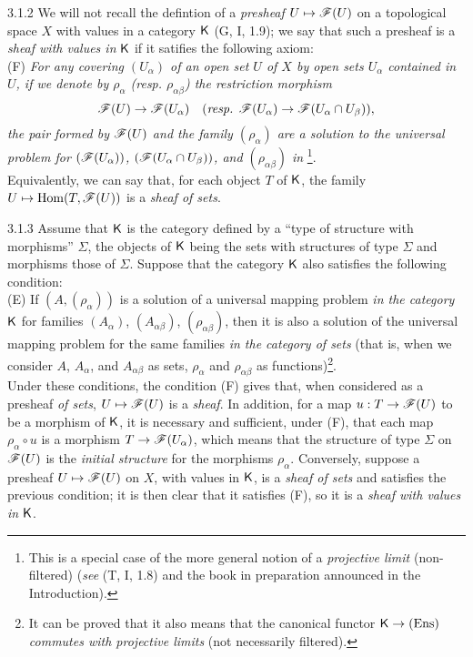 \documentclass[10pt,oneside]{book}
\begin{document}
\begin{env}{3.1.2}
\label{env-0.3.1.2}
We will not recall the defintion of a \emph{presheaf} $U\mapsto\mathscr{F}(U)$ on a topological
space $X$ with values in a category $\mathsf{K}$ (G, I, 1.9); we say that such a presheaf is a
\emph{sheaf with values in} $\mathsf{K}$ if it satifies the following axiom:\\

(F) \emph{For any covering $(U_\alpha)$ of an open set $U$ of $X$ by open sets $U_\alpha$
    contained in $U$, if we denote by $\rho_\alpha$ (resp. $\rho_{\alpha\beta}$) the
    restriction morphism}
    \[
      \mathscr{F}(U)\to\mathscr{F}(U_\alpha)
      \quad(\text{\emph{resp. }}\mathscr{F}(U_\alpha)\to\mathscr{F}(U_\alpha\cap U_\beta)),
    \]
    \emph{the pair formed by $\mathscr{F}(U)$ and the family $(\rho_\alpha)$ are a solution to
    the universal problem for $(\mathscr{F}(U_\alpha))$, $(\mathscr{F}(U_\alpha\cap U_\beta))$, and
    $(\rho_{\alpha\beta})$ in} \footnote{This is a special case of the more
    general notion of a \emph{projective limit} (non-filtered) (\emph{see} (T, I, 1.8) and
    the book in preparation announced in the Introduction).}.\\

Equivalently, we can say that, for each object $T$ of $\mathsf{K}$, the family
$U\mapsto{\mathop{\mathrm{Hom}}\nolimits}(T,\mathscr{F}(U))$ is a \emph{sheaf of sets}.
\end{env}

\begin{env}{3.1.3}
\label{env-0.3.1.3}
Assume that $\mathsf{K}$ is the category defined by a ``type of structure with morphisms'' $\Sigma$,
the objects of $\mathsf{K}$ being the sets with structures of type $\Sigma$ and morphisms those of
$\Sigma$. Suppose that the category $\mathsf{K}$ also satisfies the following condition:\\

(E) If $(A,(\rho_\alpha))$ is a solution of a universal mapping problem \emph{in the
    category} $\mathsf{K}$ for families $(A_\alpha)$, $(A_{\alpha\beta})$, $(\rho_{\alpha\beta})$,
    then it is also a solution of the universal mapping problem for the same families
    \emph{in the category of sets} (that is, when we consider $A$, $A_\alpha$, and
    $A_{\alpha\beta}$ as sets, $\rho_\alpha$ and $\rho_{\alpha\beta}$ as
    functions)\footnote{It can be proved that it also means that the canonical functor
    $\mathsf{K}\to(\mathrm{Ens})$ \emph{commutes with projective limits} (not necessarily
    filtered).}.\\

Under these conditions, the condition (F) gives that, when considered as a presheaf \emph{of
sets}, $U\mapsto\mathscr{F}(U)$ is a \emph{sheaf}. In addition, for a map $u:T\to\mathscr{F}(U)$ to be
a morphism of $\mathsf{K}$, it is necessary and sufficient, under (F), that each map
$\rho_\alpha\circ u$ is a morphism $T\to\mathscr{F}(U_\alpha)$, which means that the structure of
type $\Sigma$ on $\mathscr{F}(U)$ is the \emph{initial structure} for the morphisms $\rho_\alpha$.
Conversely, suppose a presheaf $U\mapsto\mathscr{F}(U)$ on $X$, with values in $\mathsf{K}$, is a
\emph{sheaf of sets} and satisfies the previous condition; it is then clear that it satisfies
(F), so it is a \emph{sheaf with values in} $\mathsf{K}$.
\end{env}
\end{document}
